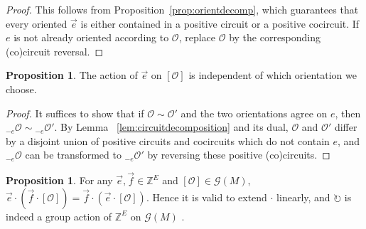 \documentclass[12pt]{amsart}
\newcommand{\ZZ}{\mathbb{Z}}
\numberwithin{equation}{section}
\theoremstyle{definition}
\newtheorem{proposition}[theorem]{Proposition}
\begin{document}
\begin{proof}
This follows from Proposition~\ref{prop:orientdecomp}, which guarantees that every oriented $\overrightarrow{e}$ is either contained in a positive circuit or a positive cocircuit.
If $e$ is not already oriented according to $\mathcal{O}$, replace $\mathcal{O}$ by the corresponding (co)circuit reversal.
 
\end{proof}

\begin{proposition} \label{Prop:IndepRep}
The action of $\overrightarrow{e}$ on $[\mathcal{O}]$ is independent of which orientation we choose.
\end{proposition}

\begin{proof}
It suffices to show that if $\mathcal{O}\sim\mathcal{O}'$ and the two orientations agree on $e$, then $_{-e}\mathcal{O}\sim\!_{-e}\mathcal{O}'$. By Lemma~ \ref{lem:circuitdecomposition} and its dual, $\mathcal{O}$ and $\mathcal{O}'$ differ by a disjoint union of positive circuits and cocircuits which do not contain $e$, and $_{-e}\mathcal{O}$ can be transformed to $_{-e}\mathcal{O}'$ by reversing these positive (co)circuits.
\end{proof}




\begin{proposition} \label{Prop:commute_action}
For any $\overrightarrow{e},\overrightarrow{f}\in \mathbb{Z}^E$ and $[\mathcal{O}]\in\mathcal{G}(M)$, $\overrightarrow{e}\cdot(\overrightarrow{f}\cdot [\mathcal{O}])=\overrightarrow{f}\cdot(\overrightarrow{e}\cdot[\mathcal{O}])$. Hence it is valid to extend $\cdot$ linearly, and $\circlearrowright$ is indeed a group action of $\ZZ^E$ on $\mathcal{G}(M)$ .
\end{proposition}
\end{document}
